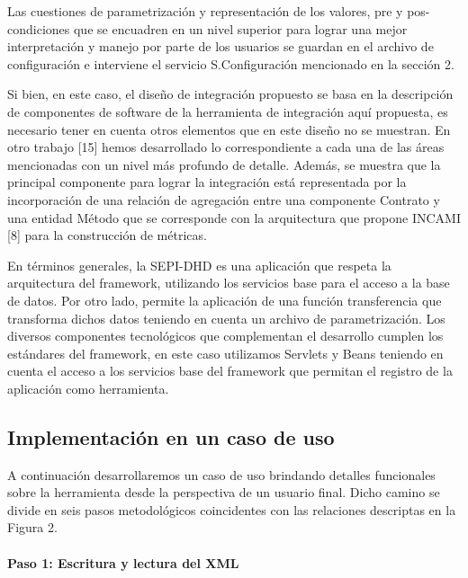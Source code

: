 Las cuestiones de parametrización y representación de los valores, pre y
pos-condiciones que se encuadren en un nivel superior para lograr una mejor
interpretación y manejo por parte de los usuarios se guardan en el archivo de
configuración e interviene el servicio S.Configuración  mencionado en la
sección 2.


Si bien, en este caso, el diseño de integración propuesto se basa en la
descripción   de componentes de software de la herramienta de integración aquí
propuesta, es necesario tener en cuenta otros elementos que en este diseño no se
muestran. En otro trabajo [15] hemos desarrollado lo correspondiente a cada una
de las áreas mencionadas con un nivel más profundo de detalle. Además, se
muestra que la principal componente para lograr la integración está representada
por la incorporación de una relación de agregación entre una componente Contrato
y una entidad Método que se corresponde con la arquitectura que propone INCAMI
[8] para la construcción de métricas.


En términos generales, la SEPI-DHD es una aplicación que respeta la arquitectura
del framework, utilizando los servicios base para el acceso a la base de datos.
Por otro lado, permite la aplicación de una función transferencia que transforma
dichos datos teniendo en cuenta un archivo de parametrización. Los diversos
componentes tecnológicos que complementan el desarrollo cumplen los estándares
del framework, en este caso utilizamos Servlets y Beans teniendo en cuenta el
acceso a los servicios base del framework que permitan el registro de la
aplicación como herramienta.


\subsection{Implementación en un caso de uso}

A continuación desarrollaremos un caso de uso brindando detalles funcionales
sobre la herramienta desde la perspectiva de un usuario final. Dicho camino se
divide en seis pasos metodológicos coincidentes con las relaciones descriptas
en la Figura 2.

\paragraph{Paso 1: Escritura y lectura del XML}

